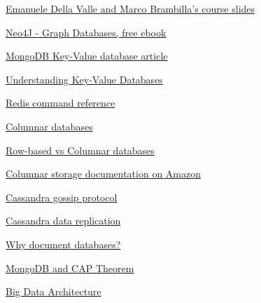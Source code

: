 \documentclass[10pt,a4paper]{article}
\begin{document}
\begin{thebibliography}{1}
\newblock\href{http://datascience.deib.polimi.it/course/unstructured-and-streaming-data-engineering/}{Emanuele Della Valle and Marco Brambilla's course slides}

\newblock \href{https://neo4j.com/graph-databases-book/?ref=home}{Neo4J - Graph Databases, free ebook}

\newblock \href{https://www.mongodb.com/key-value-database}{MongoDB Key-Value database article}

\newblock \href{https://www.dataversity.net/understanding-key-value-databases/}{Understanding Key-Value Databases}

\newblock \href{https://redis.io/commands}{Redis command reference}

\newblock\href{https://www.stitchdata.com/columnardatabase/}{Columnar databases}

\newblock \href{https://medium.com/@mangatmodi/rowise-vs-columnar-database-theory-and-in-practice-53f54c8f6505}{Row-based vs Columnar databases}

\newblock \href{https://docs.aws.amazon.com/redshift/latest/dg/c_columnar_storage_disk_mem_mgmnt.html}{Columnar storage documentation on Amazon}

\newblock \href{https://docs.datastax.com/en/cassandra-oss/3.0/cassandra/architecture/archGossipAbout.html}{Cassandra gossip protocol}

\newblock \href{https://www.guru99.com/cassandra-architecture.html#:~:text=There\%20are\%20two\%20kinds\%20of\%20replication\%20strategies\%20in\%20Cassandra.&text=SimpleStrategy\%20is\%20used\%20when\%20you,direction\%20in\%20the\%20Node\%20ring.}{Cassandra data replication}

\newblock \href{https://www.mongodb.com/document-databases}{Why document databases?}

\newblock \href{https://www.ibm.com/cloud/learn/cap-theorem#toc-mongodb-an-IH4u4oCK}{MongoDB and CAP Theorem}

\newblock \href{https://www.omnisci.com/technical-glossary/big-data-architecture}{Big Data Architecture}


\end{thebibliography}
\end{document}
